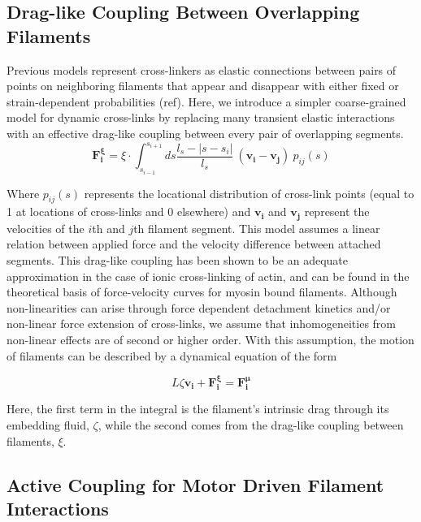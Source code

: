 \documentclass[10pt,letterpaper]{article}
\begin{document}
\subsection*{Drag-like Coupling Between Overlapping Filaments}
\label{exp_drag}
Previous models represent cross-linkers as elastic connections between pairs of points on neighboring filaments that appear and disappear with either fixed or strain-dependent probabilities (ref).  Here, we introduce a simpler coarse-grained model for dynamic cross-links by replacing many transient elastic interactions with an effective drag-like coupling between every pair of overlapping segments.
\begin{equation}
\label{eqn:drag}
\mathbf{F^{\xi}_i} = \xi \cdot \int^{s_{i+1}}_{s_{i-1}} ds \frac{l_s-|s-s_i|}{l_s} \: (\mathbf{v_i}-\mathbf{v_j}) \: p_{ij}(s)
\end{equation}

Where $p_{ij}(s)$ represents the locational distribution of cross-link points (equal to 1 at locations of cross-links and 0 elsewhere) and $\mathbf{v_i}$ and $\mathbf{v_j}$ represent the velocities of the $i$th and $j$th filament segment.  This model assumes a linear relation between applied force and the velocity difference between attached segments.  This drag-like coupling has been shown to be an adequate approximation in the case of ionic cross-linking of actin\cite{mol_fric,theo_hydroish2}, and can be found in the theoretical basis of force-velocity curves for myosin bound filaments\cite{theo_frictionShila}. Although non-linearities can arise through force dependent detachment kinetics and/or non-linear force extension of cross-links, we assume that inhomogeneities from non-linear effects are of second or higher order. With this assumption, the motion of filaments can be described by a dynamical equation of the form

\begin{equation}
\label{eqn:syst1}
L\zeta\mathbf{ v_i} +\mathbf{F^{\xi}_i}= \mathbf{F^{\mu}_i}
\end{equation}

Here, the first term in the integral is the filament's intrinsic drag through its embedding fluid, $\zeta$, while the second comes from the drag-like coupling between filaments, $\xi$.  

\subsection*{Active Coupling for Motor Driven Filament Interactions}
\end{document}
